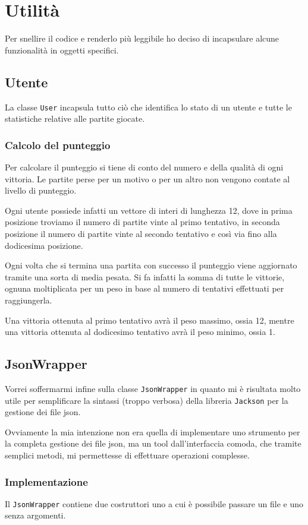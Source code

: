 \section{Utilità}
Per snellire il codice e renderlo più leggibile ho deciso di incapsulare alcune funzionalità in
oggetti specifici.

\subsection{Utente}
La classe \verb|User| incapsula tutto ciò che identifica lo stato di un utente e tutte le
statistiche relative alle partite giocate.

\subsubsection{Calcolo del punteggio}
Per calcolare il punteggio si tiene di conto del numero e della qualità di ogni vittoria. Le
partite perse per un motivo o per un altro non vengono contate al livello di punteggio.

Ogni utente possiede infatti un vettore di interi di lunghezza 12, dove in prima posizione troviamo
il numero di partite vinte al primo tentativo, in seconda posizione il numero di partite vinte al
secondo tentativo e così via fino alla dodicesima posizione.

Ogni volta che si termina una partita con successo il punteggio viene aggiornato tramite una sorta
di media pesata. Si fa infatti la somma di tutte le vittorie, ognuna moltiplicata per un peso in
base al numero di tentativi effettuati per raggiungerla.

Una vittoria ottenuta al primo tentativo avrà il peso massimo, ossia 12, mentre una vittoria
ottenuta al dodicesimo tentativo avrà il peso minimo, ossia 1.

\subsection{JsonWrapper}
Vorrei soffermarmi infine sulla classe \verb|JsonWrapper| in quanto mi è risultata molto utile per
semplificare la sintassi (troppo verbosa) della libreria \verb|Jackson| per la gestione dei file
json.

Ovviamente la mia intenzione non era quella di implementare uno strumento per la completa gestione
dei file json, ma un tool dall'interfaccia comoda, che tramite semplici metodi, mi permettesse di
effettuare operazioni complesse.

\subsubsection{Implementazione}
Il \verb|JsonWrapper| contiene due costruttori uno a cui è possibile passare un file e uno senza
argomenti.

